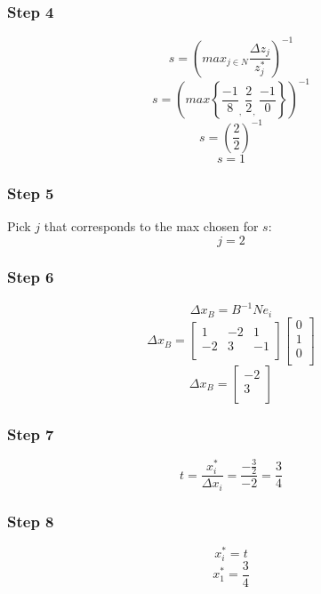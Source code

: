 \documentclass[14pt]{extarticle}
\begin{document}
\subsubsection*{Step 4}
\[
    s = \left(max_{j \in N} \frac{\Delta z_j}{z^*_j}\right)^{-1}
\]
\[
    s = \left(max \left\{ \frac{-1}{8}_{\textstyle,}\ \frac{2}{2}_{\textstyle,}\ \frac{-1}{0} \right\} \right)^{-1}
\]
\[
    s = \left(\frac{2}{2}\right)^{-1}
\]
\[
    s = 1
\]

\subsubsection*{Step 5}
Pick $j$ that corresponds to the max chosen for $s$:
\[
    j = 2
\]

\subsubsection*{Step 6}
\[
    \Delta x_B = B^{-1}N e_i
\]
\[
    \Delta x_B =
    \begin{bmatrix}
        1 & -2 & 1 \\
        -2 & 3 & -1 \\
    \end{bmatrix}
    \begin{bmatrix}
        0 \\
        1 \\
        0 \\
    \end{bmatrix}
\]
\[
    \Delta x_B =
    \begin{bmatrix}
        -2 \\
        3 \\
    \end{bmatrix}
\]

\subsubsection*{Step 7}
\[
    t = \frac{x^*_i}{\Delta x_i} = \frac{-\frac{3}{2}}{-2} = \frac{3}{4}
\]

\subsubsection*{Step 8}
\[
    x^*_i = t
\]
\[
    x^*_1 = \frac{3}{4}
\]
\end{document}
